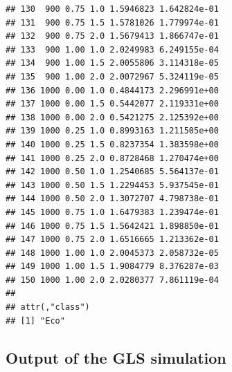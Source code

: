 \documentclass[11pt,a4paper]{article}
\begin{document}
\begin{verbatim}
## 130  900 0.75 1.0 1.5946823 1.642824e-01
## 131  900 0.75 1.5 1.5781026 1.779974e-01
## 132  900 0.75 2.0 1.5679413 1.866747e-01
## 133  900 1.00 1.0 2.0249983 6.249155e-04
## 134  900 1.00 1.5 2.0055806 3.114318e-05
## 135  900 1.00 2.0 2.0072967 5.324119e-05
## 136 1000 0.00 1.0 0.4844173 2.296991e+00
## 137 1000 0.00 1.5 0.5442077 2.119331e+00
## 138 1000 0.00 2.0 0.5421275 2.125392e+00
## 139 1000 0.25 1.0 0.8993163 1.211505e+00
## 140 1000 0.25 1.5 0.8237354 1.383598e+00
## 141 1000 0.25 2.0 0.8728468 1.270474e+00
## 142 1000 0.50 1.0 1.2540685 5.564137e-01
## 143 1000 0.50 1.5 1.2294453 5.937545e-01
## 144 1000 0.50 2.0 1.3072707 4.798738e-01
## 145 1000 0.75 1.0 1.6479383 1.239474e-01
## 146 1000 0.75 1.5 1.5642421 1.898850e-01
## 147 1000 0.75 2.0 1.6516665 1.213362e-01
## 148 1000 1.00 1.0 2.0045373 2.058732e-05
## 149 1000 1.00 1.5 1.9084779 8.376287e-03
## 150 1000 1.00 2.0 2.0280377 7.861119e-04
## 
## attr(,"class")
## [1] "Eco"
\end{verbatim}

\hypertarget{output-of-the-gls-simulation}{%
\subsection{Output of the GLS
simulation}\label{output-of-the-gls-simulation}}
\end{document}
